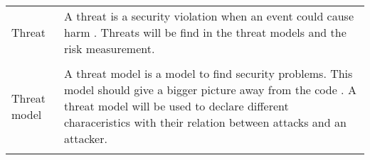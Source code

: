 \begin{center}
\begin{tabular}{ |L{4cm}|L{10cm}|  }
    & \\
    \hline
    Threat & A threat is a security violation when an event could cause harm \cite{DBLP:journals/rfc/rfc4949}. Threats will be find in the threat models and the risk measurement. \\
    & \\
    \hline
    Threat model & A threat model is a model to find security problems. This model should give a bigger picture away from the code \cite{shostack_2017}. A threat model will be used to declare different characeristics with their relation between attacks and an attacker. \\
    & \\
    \hline
  \end{tabular}
\end{center}

\newpage

